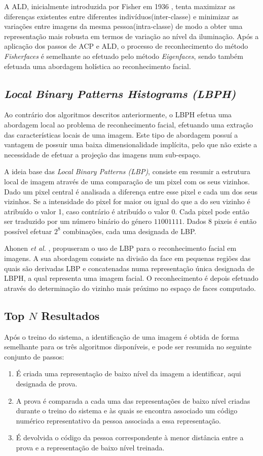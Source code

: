 A ALD, inicialmente introduzida por Fisher em 1936 \cite{FISHER1936}, tenta maximizar as diferenças existentes entre diferentes indivíduos(inter-classe) e minimizar as variações entre imagens da mesma pessoa(intra-classe) de modo a obter uma representação mais robusta em termos de variação ao nível da iluminação. Após a aplicação dos passos de ACP e ALD, o processo de reconhecimento do método \textit{Fisherfaces} é semelhante ao efetuado pelo método \textit{Eigenfaces}, sendo também efetuada uma abordagem holística ao reconhecimento facial.


\subsection{\textit{Local Binary Patterns Histograms (LBPH)}} \label{sec:lbphs}
Ao contrário dos algoritmos descritos anteriormente, o LBPH efetua uma abordagem local ao problema de reconhecimento facial, efetuando uma extração das características locais de uma imagem. Este tipo de abordagem possuí a vantagem de possuir uma baixa dimensionalidade implícita, pelo que não existe a necessidade de efetuar a projeção das imagens num sub-espaço.

A ideia base das \textit{Local Binary Patterns (LBP)}, consiste em resumir a estrutura local de imagem através de uma comparação de um pixel com os seus vizinhos. Dado um pixel central é analisada a diferença entre esse pixel e cada um dos seus vizinhos. Se a intensidade do pixel for maior ou igual do que a do seu vizinho é atribuído o valor 1, caso contrário é atribuído o valor 0. Cada pixel pode então ser traduzido por um número binário do género $11001111$. Dados $8$ pixeis é então possível efetuar $2^8$ combinações, cada uma designada de LBP.

Ahonen \textit{et al.} \cite{ahonen2004face}, propuseram o uso de LBP para o reconhecimento facial em imagens. A sua abordagem consiste na divisão da face em pequenas regiões das quais são derivadas LBP e concatenadas numa representação única designada de LBPH, a qual representa uma imagem facial. O reconhecimento é depois efetuado através do determinação do vizinho mais próximo no espaço de faces computado.

\subsection{Top $N$ Resultados} \label{sec:topn}
Após o treino do sistema, a identificação de uma imagem é obtida de forma semelhante para os três algoritmos disponíveis, e pode ser resumida no seguinte conjunto de passos:
\begin{enumerate}
\item É criada uma representação de baixo nível da imagem a identificar, aqui designada de prova.
\item A prova é comparada a cada uma das representações de baixo nível criadas durante o treino do sistema e às quais se encontra associado um código numérico representativo da pessoa associada a essa representação.
\item É devolvida o código da pessoa correspondente à menor distância entre a prova e a representação de baixo nível treinada.
\end{enumerate}

